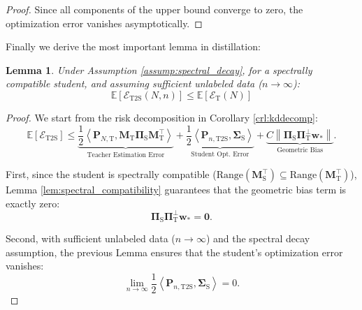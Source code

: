 \documentclass{article}
\theoremstyle{definition}
\theoremstyle{definition}
\theoremstyle{plain}
\theoremstyle{plain}
\theoremstyle{plain}
\newtheorem{lemma}{Lemma}
\theoremstyle{plain}
\theoremstyle{plain}
\newcommand{\bs}[1]{\boldsymbol{\mathbf{#1}}}
\newcommand{\Ex}{\mathbb{E}}
\newcommand{\te}{\mathrm{T}}
\newcommand{\st}{\mathrm{S}}
\newcommand{\ts}{\mathrm{T2S}}
\newcommand{\M}{\mathbf{M}}
\newcommand{\Sig}{\mathbf{\Sigma}}
\newcommand{\w}{\mathbf{w}}
\newcommand{\inner}[1]{\left\langle#1\right\rangle}
\begin{document}
\begin{proof}
    Since all components of the upper bound converge to zero, the optimization error vanishes asymptotically.
\end{proof}

Finally we derive the most important lemma in distillation:


\begin{lemma}
    Under Assumption \ref{assump:spectral_decay}, for a spectrally compatible student, and assuming sufficient unlabeled data ($n \to \infty$):
    \begin{equation}
        \Ex[\mathcal{E}_{\mathrm{T2S}}(N,n)] \leq \Ex[\mathcal{E}_{\mathrm{T}}(N)]
    \end{equation}
\end{lemma}

\begin{proof}
    We start from the risk decomposition in Corollary \ref{crl:kddecomp}:
    \begin{equation}
        \Ex[\mathcal{E}_{\mathrm{T2S}}] \leq \underbrace{\frac{1}{2}\inner{\bs P_{N,\te},\M_\te\bs \Pi_{\st}\M_\te^\top}}_{\text{Teacher Estimation Error}} + \underbrace{\frac{1}{2}\inner{\bs P_{n,\ts},\Sig_{\st}}}_{\text{Student Opt. Error}} + \underbrace{C\left\|\bs \Pi_{\st}\bs \Pi_{\te}^{\perp}\w_{*}\right\|}_{\text{Geometric Bias}}.
    \end{equation}

    First, since the student is spectrally compatible ($\text{Range}(\M_\st^\top) \subseteq \text{Range}(\M_\te^\top)$), Lemma \ref{lem:spectral_compatibility} guarantees that the geometric bias term is exactly zero:
    \begin{equation}
        \bs \Pi_{\st}\bs \Pi_{\te}^{\perp}\w_{*} = \bs 0.
    \end{equation}

    Second, with sufficient unlabeled data ($n \to \infty$) and the spectral decay assumption, the previous Lemma ensures that the student's optimization error vanishes:
    \begin{equation}
        \lim_{n\rightarrow\infty} \frac{1}{2}\inner{\bs P_{n,\ts},\Sig_{\st}} = 0.
    \end{equation}


\end{proof}
\end{document}
